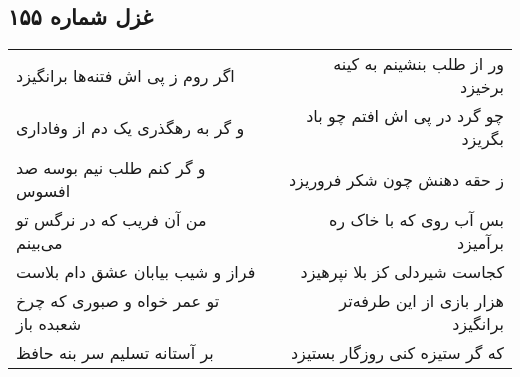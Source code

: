 \begin{center}
\section*{غزل شماره ۱۵۵}
\label{sec:sh155}
\begin{longtable}{l p{0.5cm} r}
اگر روم ز پی اش فتنه‌ها برانگیزد
&&
ور از طلب بنشینم به کینه برخیزد
\\
و گر به رهگذری یک دم از وفاداری
&&
چو گرد در پی اش افتم چو باد بگریزد
\\
و گر کنم طلب نیم بوسه صد افسوس
&&
ز حقه دهنش چون شکر فروریزد
\\
من آن فریب که در نرگس تو می‌بینم
&&
بس آب روی که با خاک ره برآمیزد
\\
فراز و شیب بیابان عشق دام بلاست
&&
کجاست شیردلی کز بلا نپرهیزد
\\
تو عمر خواه و صبوری که چرخ شعبده باز
&&
هزار بازی از این طرفه‌تر برانگیزد
\\
بر آستانه تسلیم سر بنه حافظ
&&
که گر ستیزه کنی روزگار بستیزد
\\
\end{longtable}
\end{center}
